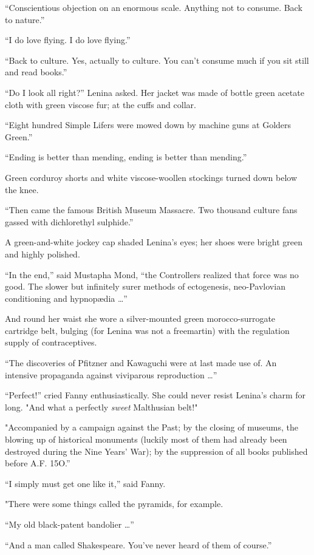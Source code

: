 \documentclass[12pt]{report}
\begin{document}
``Conscientious objection on an enormous scale. Anything not to consume.
Back to nature.''

``I do love flying. I do love flying.''

``Back to culture. Yes, actually to culture. You can't consume much if
you sit still and read books.''

``Do I look all right?'' Lenina asked. Her jacket was made of bottle
green acetate cloth with green viscose fur; at the cuffs and collar.

``Eight hundred Simple Lifers were mowed down by machine guns at Golders
Green.''

``Ending is better than mending, ending is better than mending.''

Green corduroy shorts and white viscose-woollen stockings turned down
below the knee.

``Then came the famous British Museum Massacre. Two thousand culture
fans gassed with dichlorethyl sulphide.''

A green-and-white jockey cap shaded Lenina's eyes; her shoes were bright
green and highly polished.

``In the end,'' said Mustapha Mond, ``the Controllers realized that
force was no good. The slower but infinitely surer methods of
ectogenesis, neo-Pavlovian conditioning and hypnopædia \ldots{}''

And round her waist she wore a silver-mounted green morocco-surrogate
cartridge belt, bulging (for Lenina was not a freemartin) with the
regulation supply of contraceptives.

``The discoveries of Pfitzner and Kawaguchi were at last made use of. An
intensive propaganda against viviparous reproduction \ldots{}''

``Perfect!'' cried Fanny enthusiastically. She could never resist
Lenina's charm for long. "And what a perfectly \emph{sweet} Malthusian
belt!"

"Accompanied by a campaign against the Past; by the closing of museums,
the blowing up of historical monuments (luckily most of them had already
been destroyed during the Nine Years' War); by the suppression of all
books published before A.F. 15O.''

``I simply must get one like it,'' said Fanny.

"There were some things called the pyramids, for example.

``My old black-patent bandolier \ldots{}''

``And a man called Shakespeare. You've never heard of them of course.''
\end{document}
